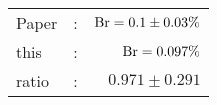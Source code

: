       \begin{tabular}{lcr}
          Paper &:& $\mathrm{Br}  = 0.1\pm 0.03\%$ \\
          this      &:& $\mathrm{Br}  = 0.097\%$ \\
		  ratio   &:& $0.971\pm 0.291$ \\
      \end{tabular}
